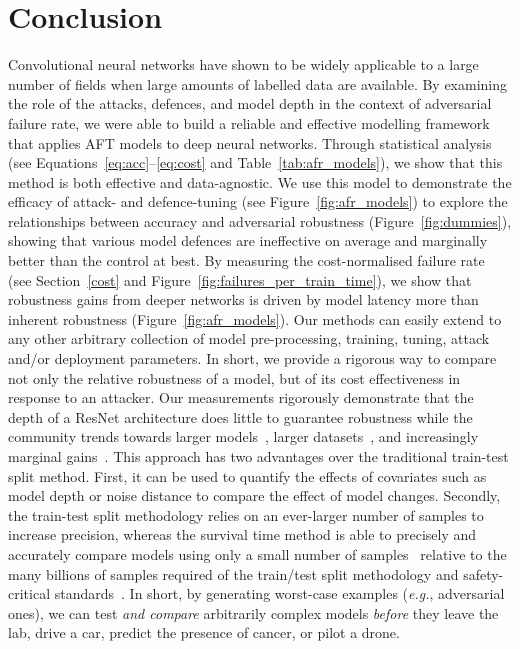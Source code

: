 \section{Conclusion}
Convolutional neural networks have shown to be widely applicable to a large number of fields when large amounts of labelled data are available. By examining the role of the attacks, defences, and model depth in the context of adversarial failure rate, we were able to build a reliable and effective modelling framework that applies AFT models to deep neural networks. Through statistical analysis (see Equations~\ref{eq:acc}--\ref{eq:cost} and Table~\ref{tab:afr_models}), we show that this method is both effective and data-agnostic.  We use this model to demonstrate the efficacy of attack- and defence-tuning (see Figure~\ref{fig:afr_models}) to  explore the relationships between accuracy and adversarial robustness (Figure~\ref{fig:dummies}), showing that various model defences are ineffective on average and marginally better than the control at best.
By measuring the cost-normalised failure rate (see Section~\ref{cost} and Figure~\ref{fig:failures_per_train_time}), we show that robustness gains from deeper networks is driven by model latency more than inherent robustness (Figure~\ref{fig:afr_models}). Our methods can easily extend to any other arbitrary collection of model pre-processing, training, tuning, attack and/or deployment parameters. In short, we provide a rigorous way to compare not only the relative robustness of a model, but of its cost effectiveness in response to an attacker. Our measurements rigorously demonstrate  that the depth of a ResNet architecture does little to guarantee robustness while the community trends towards larger models~\cite{desislavov2021compute}, larger datasets~\cite{desislavov2021compute,bailly2022effects}, and increasingly marginal gains~\cite{sun2017revisiting}. This approach has two advantages over the traditional train-test split method. First, it can be used to quantify the effects of covariates such as model depth or noise distance to compare the effect of model changes. Secondly, the train-test split methodology relies on an ever-larger number of samples to increase precision, whereas the survival time method is able to precisely and accurately compare models using only a small number of samples~\cite{schmoor2000sample,lachin1981introduction} relative to the many billions of samples required of the train/test split methodology and safety-critical standards~\cite{iso26262,IEC61508,IEC62034,meyers}.
In short, by generating worst-case examples (\textit{e.g.}, adversarial ones), we can test \textit{and compare} arbitrarily complex models \textit{before} they leave the lab, drive a car, predict the presence of cancer, or pilot a drone.
